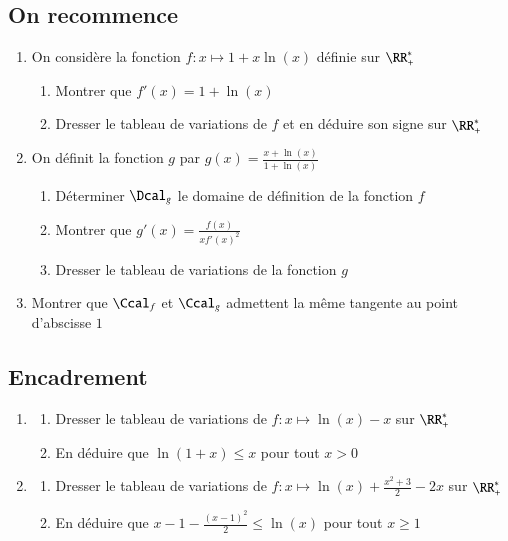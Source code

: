 \documentclass[oneside,12pt]{article}          %
\begin{document}
\subsection{On recommence}
\begin{enumerate}
	\item On considère la fonction $f:x\mapsto1+x\ln(x)$ définie sur $\RR^*_+$
	\begin{enumerate}
		\item Montrer que $f'(x)=1+\ln(x)$
		\item Dresser le tableau de variations de $f$ et en déduire son signe sur $\RR_+^*$
	\end{enumerate}
	\item On définit la fonction $g$ par $g(x)=\frac{x+\ln(x)}{1+\ln(x)}$
	\begin{enumerate}
		\item Déterminer $\Dcal_g$ le domaine de définition de la fonction $f$
		\item Montrer que $g'(x)=\frac{f(x)}{x{f'(x)}^2}$
		\item Dresser le tableau de variations de la fonction $g$
	\end{enumerate}
	\item Montrer que $\Ccal_f$ et $\Ccal_g$ admettent la même tangente au point d'abscisse $1$
\end{enumerate}



\subsection{Encadrement}
\begin{enumerate}
    \item \begin{enumerate}
    	\item Dresser le tableau de variations de $f:x\mapsto \ln(x)-x$ sur $\RR_+^*$
    	\item En déduire que $\ln(1+x)\leq x$ pour tout $x>0$
	\end{enumerate}
    \item \begin{enumerate}
    	\item Dresser le tableau de variations de $f:x\mapsto \ln(x)+\frac{x^2+3}{2}-2x$ sur $\RR_+^*$
    	\item En déduire que $x-1-\frac{(x-1)^2}{2}\leq \ln(x)$ pour tout $x\geq1$
	\end{enumerate}
\end{enumerate}
\end{document}
